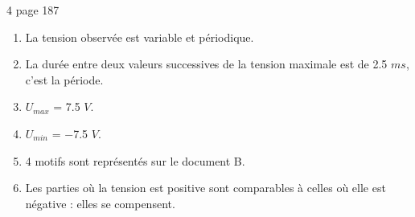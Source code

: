 \begin{myact}{4 page 187}
	\begin{enumerate}
		\item La tension observée est variable et périodique.\pause
		\item La durée entre deux valeurs successives de la tension maximale est de \num{2.5} $ms$, c'est la période.\pause
		\item $U_{max}$ = \num{7.5} $V$.\pause
		\item  $U_{min}$ = \num{-7.5} $V$.\pause
		\item 4 motifs sont représentés sur le document B.\pause
		\item Les parties où la tension est positive sont comparables à celles où elle est négative : elles se compensent.		
	\end{enumerate}
\end{myact}